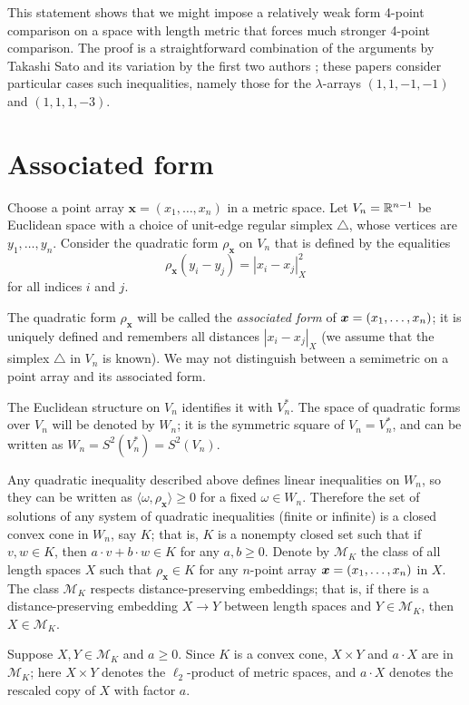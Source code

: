 \documentclass[a4paper,10pt]{article}
\begin{document}
This statement shows that we might impose a relatively weak form 4-point comparison on a space with length metric that forces much stronger 4-point comparison.
The proof is a straightforward combination of the arguments by Takashi Sato \cite{sato} and its variation by the first two authors \cite{lebedeva-petrunin-2010};
these papers consider particular cases
such inequalities, namely those for the $\lambda$-arrays $(1,1,-1,-1)$ and $(1,1,1,-3)$.

\section{Associated form}\label{Associated form}

Choose a point array $\bm{x}=(x_1,\dots,x_n)$ in a metric space.
Let $V_n\z=\RR^{n-1}$ be Euclidean space with a choice of unit-edge regular simplex $\triangle$, whose vertices are $y_1,\dots,y_n$.
Consider the quadratic form $\rho_{\bm{x}}$ on $V_n$ that is defined by the equalities
\[\rho_{\bm{x}}(y_i-y_j)=|x_i-x_j|^2_X\]
for all indices $i$ and $j$.

The quadratic form $\rho_{\bm{x}}$ will be called the \emph{associated form} of $\bm{x}=(x_1,\z\dots,x_n)$;
it is uniquely defined and remembers all distances $|x_i-x_j|_X$
(we assume that the simplex $\triangle$ in $V_n$ is known).
We may not distinguish between a semimetric on a point array and its associated form.

The Euclidean structure on $V_n$ identifies it with $V_n^*$.
The space of quadratic forms over $V_n$ will be denoted by $W_n$;
it is the symmetric square of $V_n=V_n^*$, and can be written as $W_n=S^2(V_n^*)=S^2(V_n)$.

Any quadratic inequality described above defines linear inequalities on $W_n$, so they can be written as $\langle\omega,\rho_{\bm{x}}\rangle\ge 0$ for a fixed $\omega\in W_n$.
Therefore the set of solutions of any system of quadratic inequalities (finite or infinite) is a closed convex cone in $W_n$, say $K$;
that is, $K$ is a nonempty closed set such that if $v,w\in K$, then $a\cdot v+b\cdot w\in K$ for any $a,b\ge0$.
Denote by $\mathcal{M}_K$ the class of all length spaces $X$ such that
$\rho_{\bm{x}}\in K$ for any $n$-point array $\bm{x}\z=(x_1,\dots,x_n)$ in $X$.
The class $\mathcal{M}_K$ respects distance-preserving embeddings; that is,
if there is a distance-preserving embedding $X\to Y$ between length spaces and $Y \in  \mathcal{M}_K$, then $X\in \mathcal{M}_K$.

Suppose $X,Y\in  \mathcal{M}_K$ and $a\ge 0$.
Since $K$ is a convex cone,  $X\times Y$ and $a\cdot X$ are in $\mathcal{M}_K$;
here $X\times Y$ denotes the $\ell_2$-product of metric spaces, and
$a\cdot X$ denotes the rescaled copy of $X$ with factor $a$.
\end{document}
